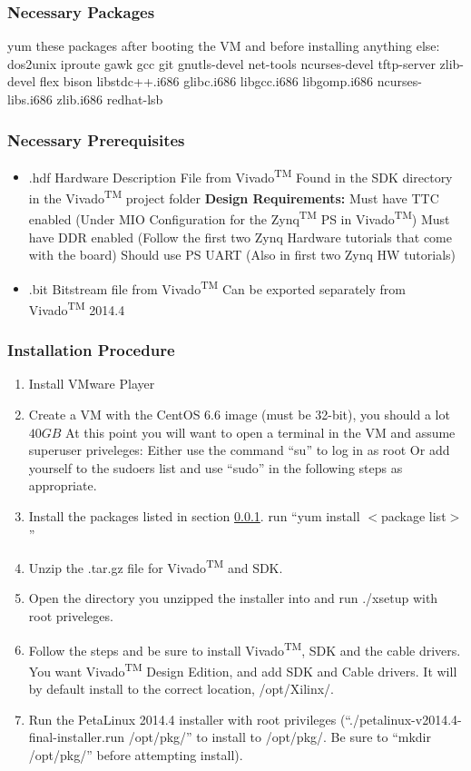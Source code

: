 \subsubsection{Necessary Packages}
\label{pack}
yum these packages after booting the VM and before installing anything else: \\
\nohyphens{dos2unix iproute gawk gcc git gnutls-devel net-tools ncurses-devel tftp-server zlib-devel flex bison libstdc++.i686 glibc.i686 libgcc.i686 libgomp.i686 ncurses-libs.i686 zlib.i686 redhat-lsb}

\subsubsection{Necessary Prerequisites}
\label{prereqs}
\begin{itemize}
\item .hdf Hardware Description File from Vivado\textsuperscript{TM}
\subitem Found in the SDK directory in the Vivado\textsuperscript{TM} project folder
\subitem \textbf{Design Requirements:}
\subitem Must have TTC enabled (Under MIO Configuration for the Zynq\textsuperscript{TM} PS  in Vivado\textsuperscript{TM})
\subitem Must have DDR enabled (Follow the first two Zynq Hardware tutorials that come with the board)
\subitem Should use PS UART (Also in first two Zynq HW tutorials)
\item .bit Bitstream file from Vivado\textsuperscript{TM}
\subitem Can be exported separately from Vivado\textsuperscript{TM} 2014.4
\end{itemize}

\subsubsection{Installation Procedure}

\begin{enumerate}
\item Install VMware Player
\item Create a VM with the CentOS 6.6 image (must be 32-bit), you should a lot $40GB$
\subitem At this point you will want to open a terminal in the VM and assume superuser priveleges:
\subsubitem Either use the command ``su'' to log in as root
\subsubitem Or add yourself to the sudoers list and use ``sudo'' in the following steps as appropriate.
\item Install the packages listed in section \ref{pack}.
\subitem run ``yum install $<$package list$>$''
\item Unzip the .tar.gz file for Vivado\textsuperscript{TM} and SDK.
\item Open the directory you unzipped the installer into and run ./xsetup with root priveleges.
\item Follow the steps and be sure to install Vivado\textsuperscript{TM}, SDK and the cable drivers. You want Vivado\textsuperscript{TM} Design Edition, and add SDK and Cable drivers. It will by default install to the correct location, /opt/Xilinx/.
\item\nohyphens{ Run the PetaLinux 2014.4 installer with root privileges (``./petalinux-v2014.4-final-installer.run /opt/pkg/'' to install to /opt/pkg/. Be sure to ``mkdir /opt/pkg/'' before attempting install).}
\end{enumerate}
